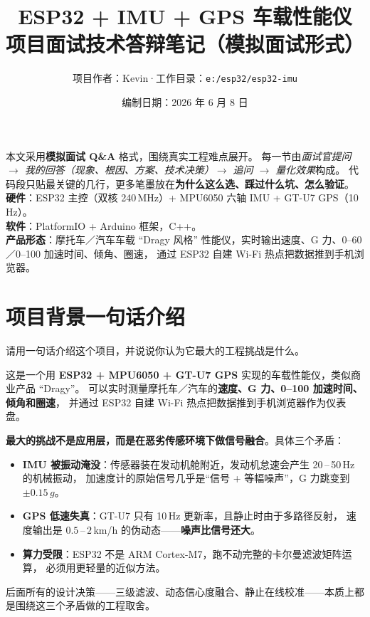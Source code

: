\documentclass[UTF8,11pt,a4paper]{ctexart}
\title{\textbf{\Huge ESP32 + IMU + GPS 车载性能仪}\\[6pt]
\Large 项目面试技术答辩笔记（模拟面试形式）}
\author{项目作者：Kevin\quad·\quad 工作目录：\texttt{e:/esp32/esp32-imu}}
\date{编制日期：2026 年 6 月 8 日}
\begin{document}
\maketitle
\thispagestyle{empty}

\begin{tcolorbox}[colback=teal!5,colframe=teal!50!black,arc=2mm,title=\textbf{文档说明}]
本文采用\textbf{模拟面试 Q\&A} 格式，围绕真实工程难点展开。
每一节由\textit{面试官提问 $\to$ 我的回答（现象、根因、方案、技术决策）$\to$ 追问 $\to$ 量化效果}构成。
代码段只贴最关键的几行，更多笔墨放在\textbf{为什么这么选、踩过什么坑、怎么验证}。\\[2pt]
\textbf{硬件}：ESP32 主控（双核 240\,MHz）+ MPU6050 六轴 IMU + GT-U7 GPS（10\,Hz）。\\
\textbf{软件}：PlatformIO + Arduino 框架，C++。\\
\textbf{产品形态}：摩托车／汽车车载 ``Dragy 风格'' 性能仪，实时输出速度、G 力、0--60／0--100 加速时间、倾角、圈速，
通过 ESP32 自建 Wi-Fi 热点把数据推到手机浏览器。
\end{tcolorbox}

\tableofcontents
\newpage

\section{项目背景一句话介绍}

\begin{interviewer}
请用一句话介绍这个项目，并说说你认为它最大的工程挑战是什么。
\end{interviewer}

\begin{candidate}
这是一个用 \textbf{ESP32 + MPU6050 + GT-U7 GPS} 实现的车载性能仪，类似商业产品 ``Dragy''。
可以实时测量摩托车／汽车的\textbf{速度、G 力、0--100 加速时间、倾角和圈速}，
并通过 ESP32 自建 Wi-Fi 热点把数据推到手机浏览器作为仪表盘。

\medskip
\textbf{最大的挑战不是应用层，而是在恶劣传感环境下做信号融合}。具体三个矛盾：
\begin{itemize}[leftmargin=1.4em,topsep=2pt,itemsep=2pt]
  \item \textbf{IMU 被振动淹没}：传感器装在发动机舱附近，发动机怠速会产生 20\,–\,50\,Hz 的机械振动，
        加速度计的原始信号几乎是``信号 + 等幅噪声''，G 力跳变到 $\pm 0.15\,g$。
  \item \textbf{GPS 低速失真}：GT-U7 只有 10\,Hz 更新率，且静止时由于多路径反射，
        速度输出是 $0.5$\,–\,$2$\,km/h 的伪动态——\textbf{噪声比信号还大}。
  \item \textbf{算力受限}：ESP32 不是 ARM Cortex-M7，跑不动完整的卡尔曼滤波矩阵运算，
        必须用更轻量的近似方法。
\end{itemize}

后面所有的设计决策——三级滤波、动态信心度融合、静止在线校准——本质上都是围绕这三个矛盾做的工程取舍。
\end{candidate}
\end{document}
